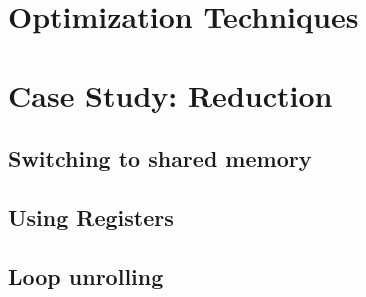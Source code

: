




\section{Optimization Techniques}


\section{Case Study: Reduction}

\subsection{Switching to shared memory}


\subsection{Using Registers}


\subsection{Loop unrolling}\label{sec:loopUnrolling}










